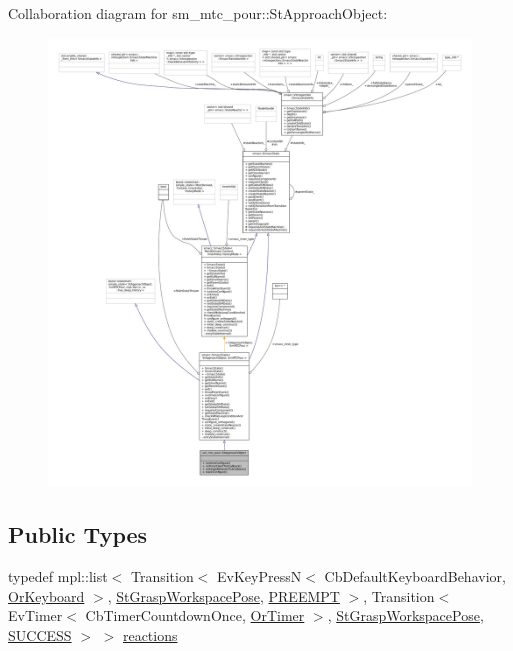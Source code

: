 Collaboration diagram for sm\+\_\+mtc\+\_\+pour\+:\+:St\+Approach\+Object\+:
\nopagebreak
\begin{figure}[H]
\begin{center}
\leavevmode
\includegraphics[width=350pt]{structsm__mtc__pour_1_1StApproachObject__coll__graph}
\end{center}
\end{figure}
\subsection*{Public Types}
\begin{DoxyCompactItemize}
\item 
typedef mpl\+::list$<$ Transition$<$ Ev\+Key\+PressN$<$ Cb\+Default\+Keyboard\+Behavior, \hyperlink{classsm__mtc__pour_1_1OrKeyboard}{Or\+Keyboard} $>$, \hyperlink{structsm__mtc__pour_1_1StGraspWorkspacePose}{St\+Grasp\+Workspace\+Pose}, \hyperlink{classPREEMPT}{P\+R\+E\+E\+M\+PT} $>$, Transition$<$ Ev\+Timer$<$ Cb\+Timer\+Countdown\+Once, \hyperlink{classsm__mtc__pour_1_1OrTimer}{Or\+Timer} $>$, \hyperlink{structsm__mtc__pour_1_1StGraspWorkspacePose}{St\+Grasp\+Workspace\+Pose}, \hyperlink{classSUCCESS}{S\+U\+C\+C\+E\+SS} $>$ $>$ \hyperlink{structsm__mtc__pour_1_1StApproachObject_a77af7fe8202535ce4430f32dc6a9a8e7}{reactions}
\end{DoxyCompactItemize}
